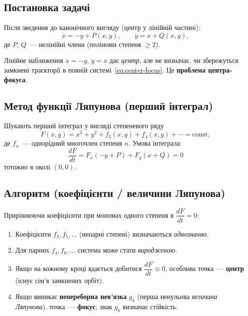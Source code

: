 \documentclass[12pt,a4paper]{article}
\theoremstyle{definition}
\theoremstyle{plain}
\begin{document}
\subsection{Постановка задачі}

Після зведення до канонічного вигляду (центр у лінійній частині):
\begin{equation}
  \dot x = -y + P(x,y), \qquad \dot y = x + Q(x,y),
  \label{eq:center-focus}
\end{equation}
де $P$, $Q$~--- нелінійні члени (поліноми степеня $\ge2$).

Лінійне наближення $\dot x=-y$, $\dot y=x$ дає \emph{центр}, але не
визначає, чи збережуться замкнені траєкторії в повній
системі~\eqref{eq:center-focus}. Це \textbf{проблема центра-фокуса}.

\subsection{Метод функції Ляпунова (перший інтеграл)}

Шукають перший інтеграл у вигляді степеневого ряду
\begin{equation}
  F(x,y) = x^2 + y^2 + f_3(x,y) + f_4(x,y) + \cdots = \mathrm{const},
\end{equation}
де $f_n$~--- однорідний многочлен степеня $n$. Умова інтеграла:
\begin{equation}
  \frac{dF}{dt} = F_x(-y+P) + F_y(x+Q) = 0
\end{equation}
тотожно в околі $(0,0)$.

\subsection{Алгоритм (коефіцієнти / величини Ляпунова)}

Прирівнюючи коефіцієнти при мономах одного степеня в $\dfrac{dF}{dt}=0$:

\begin{enumerate}[leftmargin=1.8em]
  \item Коефіцієнти $f_3, f_5, \ldots$ (непарні степені) визначаються
        \emph{однозначно}.
  \item Для парних $f_4, f_6, \ldots$ система може стати \emph{виродженою}.
  \item Якщо на кожному кроці вдається добитися $\dfrac{dF}{dt}\equiv0$,
        особлива точка~--- \textbf{центр} (існує сім'я замкнених орбіт).
  \item Якщо виникає \textbf{непереборна нев'язка} $g_k$ (перша ненульова
        \emph{величина Ляпунова}), точка~--- \textbf{фокус}; знак $g_k$
        визначає стійкість.
\end{enumerate}
\end{document}
